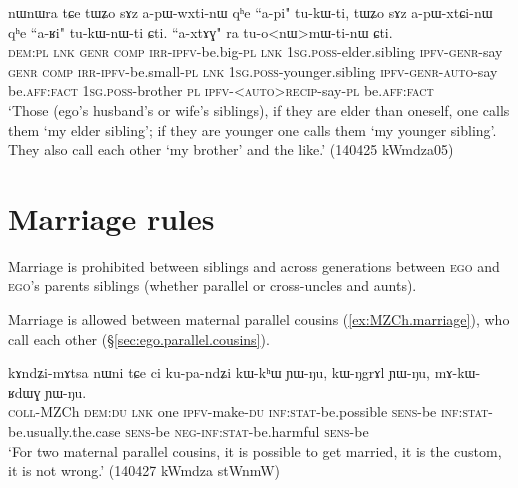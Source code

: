 \begin{exe}
\ex \label{ex:HB.HZ.WB.WZ}
\gll   nɯnɯra tɕe tɯʑo sɤz a-pɯ-wxti-nɯ qʰe ``a-pi" tu-kɯ-ti, tɯʑo sɤz a-pɯ-xtɕi-nɯ qʰe ``a-ʁi" tu-kɯ-nɯ-ti ɕti. ``a-xtɤɣ" ra tu-o<nɯ>mɯ-ti-nɯ ɕti. \\
\textsc{dem}:\textsc{pl} \textsc{lnk} \textsc{genr} \textsc{comp} \textsc{irr}-\textsc{ipfv}-be.big-\textsc{pl} \textsc{lnk} \textsc{1sg}.\textsc{poss}-elder.sibling \textsc{ipfv}-\textsc{genr}-say \textsc{genr} \textsc{comp} \textsc{irr}-\textsc{ipfv}-be.small-\textsc{pl} \textsc{lnk} \textsc{1sg}.\textsc{poss}-younger.sibling \textsc{ipfv}-\textsc{genr}-\textsc{auto}-say be.\textsc{aff}:\textsc{fact} \textsc{1sg}.\textsc{poss}-brother \textsc{pl} \textsc{ipfv}-<\textsc{auto}>\textsc{recip}-say-\textsc{pl} be.\textsc{aff}:\textsc{fact}  \\
\glt `Those (ego's husband's or wife's siblings), if they are elder than oneself, one calls them  `my elder sibling'; if they are younger one calls them  `my younger sibling'. They also call each other `my brother' and the like.' (140425 kWmdza05)
\end{exe}

\section{Marriage rules} \label{sec:marriage.rules}
Marriage is prohibited between siblings and across generations between \textsc{ego} and \textsc{ego}'s parents siblings (whether parallel or cross-uncles and aunts).

Marriage is allowed between maternal parallel cousins (\ref{ex:MZCh.marriage}), who call each other  (§\ref{sec:ego.parallel.cousins}).

\begin{exe}
\ex \label{ex:MZCh.marriage}
\gll kɤndʑi-mɤtsa nɯni tɕe ci ku-pa-ndʑi kɯ-kʰɯ ɲɯ-ŋu, kɯ-ŋgrɤl ɲɯ-ŋu, mɤ-kɯ-ʁdɯɣ ɲɯ-ŋu. \\
\textsc{coll}-MZCh \textsc{dem}:\textsc{du} \textsc{lnk} one \textsc{ipfv}-make-\textsc{du} \textsc{inf}:\textsc{stat}-be.possible \textsc{sens}-be \textsc{inf}:\textsc{stat}-be.usually.the.case \textsc{sens}-be \textsc{neg}-\textsc{inf}:\textsc{stat}-be.harmful \textsc{sens}-be \\
\glt `For two maternal parallel cousins, it is possible to get married, it is the custom, it is not wrong.' (140427 kWmdza stWnmW)
\end{exe}

